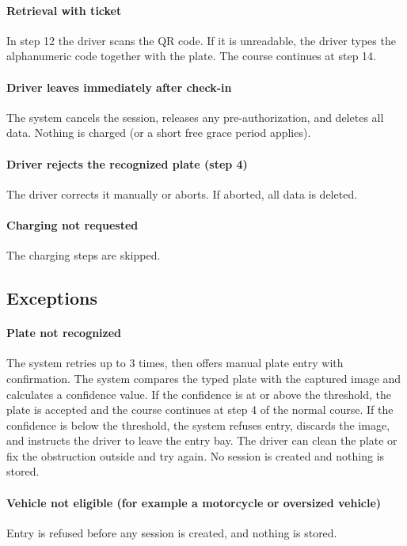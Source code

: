 \documentclass[11pt,a4paper]{article}
\begin{document}
\paragraph{Retrieval with ticket}
In step 12 the driver scans the QR code. If it is unreadable, the driver
types the alphanumeric code together with the plate. The course
continues at step 14.

\paragraph{Driver leaves immediately after check-in}
The system cancels the session, releases any pre-authorization, and
deletes all data. Nothing is charged (or a short free grace period
applies).

\paragraph{Driver rejects the recognized plate (step 4)}
The driver corrects it manually or aborts. If aborted, all data is
deleted.

\paragraph{Charging not requested}
The charging steps are skipped.

\subsection*{Exceptions}

\paragraph{Plate not recognized}
The system retries up to 3 times, then offers manual plate entry with
confirmation. The system compares the typed plate with the
captured image and calculates a confidence value. If the confidence
is at or above the threshold, the plate is accepted and the course
continues at step 4 of the normal course. If the confidence is below
the threshold, the system refuses entry, discards the image, and
instructs the driver to leave the entry bay. The driver can clean the
plate or fix the obstruction outside and try again. No session is
created and nothing is stored.

\paragraph{Vehicle not eligible (for example a motorcycle or oversized vehicle)}
Entry is refused before any session is created, and nothing is stored.
\end{document}
